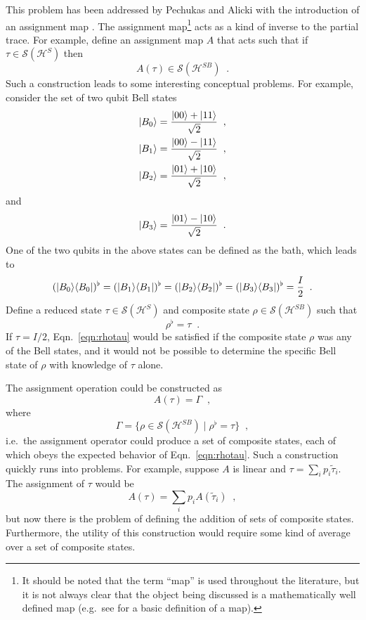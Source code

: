 This problem has been addressed by Pechukas and Alicki with the introduction of an assignment map \cite{Pechukas1994}\cite{Alicki1995}\cite{Pechukas1995}.  The assignment map\footnote{It should be noted that the term ``map'' is used throughout the literature, but it is not always clear that the object being discussed is a mathematically well defined map (e.g.\ see \cite{Fraleigh2003} for a basic definition of a map).} acts as a kind of inverse to the partial trace.  For example, define an assignment map $A$ that acts such that if $\tau\in\mathcal{S}(\mathcal{H}^S)$ then
$$
A(\tau)\in\mathcal{S}(\mathcal{H}^{SB})\;\;.
$$
Such a construction leads to some interesting conceptual problems.  For example, consider the set of two qubit Bell states
\begin{eqnarray*}
\left|B_0\right\rangle = \frac{\left|00\right\rangle+\left|11\right\rangle}{\sqrt{2}}\;\;,\\
\left|B_1\right\rangle = \frac{\left|00\right\rangle-\left|11\right\rangle}{\sqrt{2}}\;\;,\\
\left|B_2\right\rangle = \frac{\left|01\right\rangle+\left|10\right\rangle}{\sqrt{2}}\;\;,
\end{eqnarray*}
and
$$
\left|B_3\right\rangle = \frac{\left|01\right\rangle-\left|10\right\rangle}{\sqrt{2}}\;\;.
$$
One of the two qubits in the above states can be defined as the bath, which leads to
$$
(|B_0\rangle\langle B_0|)^\flat = (|B_1\rangle\langle B_1|)^\flat = (|B_2\rangle\langle B_2|)^\flat = (|B_3\rangle\langle B_3|)^\flat = \frac{I}{2}\;\;.
$$
Define a reduced state $\tau\in\mathcal{S}(\mathcal{H}^{S})$ and composite state $\rho\in\mathcal{S}(\mathcal{H}^{SB})$ such that 
\begin{equation}
\label{eqn:rhotau}
\rho^\flat = \tau\;\;.
\end{equation} 
If $\tau = I/2$, Eqn.\ \ref{eqn:rhotau} would be satisfied if the composite state $\rho$ was any of the Bell states, and it would not be possible to determine the specific Bell state of $\rho$ with knowledge of $\tau$ alone.  

The assignment operation could be constructed as
$$
A(\tau) = \Gamma\;\;,
$$
where
$$
\Gamma = \{\rho\in\mathcal{S}(\mathcal{H}^{SB})\;|\;\rho^\flat = \tau\}\;\;,
$$
i.e.\ the assignment operator could produce a set of composite states, each of which obeys the expected behavior of Eqn.\ \ref{eqn:rhotau}.  Such a construction quickly runs into problems.  For example, suppose $A$ is linear and $\tau=\sum_i p_i \tilde{\tau}_i$.  The assignment of $\tau$ would be
$$
A(\tau) = \sum_i p_i A(\tilde{\tau}_i)\;\;,
$$
but now there is the problem of defining the addition of sets of composite states.  Furthermore, the utility of this construction would require some kind of average over a set of composite states.  

